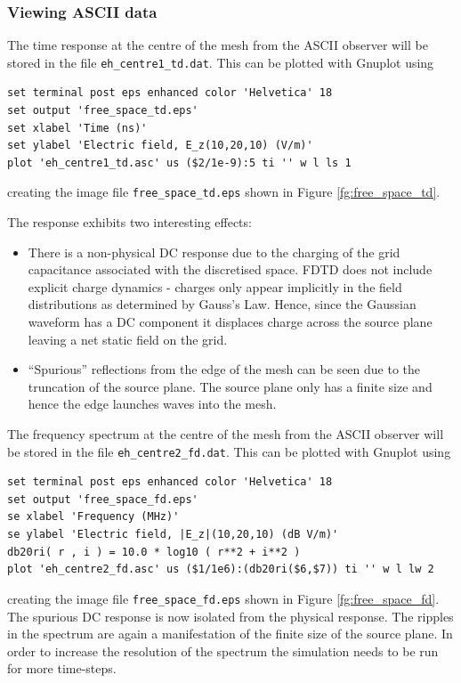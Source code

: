 \documentclass[onecolumn,a4paper]{article}
\numberwithin{equation}{section}
\begin{document}
\subsubsection{Viewing ASCII data}

The time response at the centre of the mesh from the ASCII observer will be
stored in the file \texttt{eh\_centre1\_td.dat}. This can be plotted with Gnuplot
using
\begin{verbatim}
set terminal post eps enhanced color 'Helvetica' 18
set output 'free_space_td.eps'
set xlabel 'Time (ns)'
set ylabel 'Electric field, E_z(10,20,10) (V/m)'
plot 'eh_centre1_td.asc' us ($2/1e-9):5 ti '' w l ls 1
\end{verbatim}
creating the image file \texttt{free\_space\_td.eps} shown in Figure \ref{fg:free_space_td}.

The response exhibits two interesting effects:
\begin{itemize}
 \item There is a non-physical DC response due to the charging of the grid capacitance associated
 with the discretised space. FDTD does not include explicit charge dynamics - charges only appear implicitly
 in the field distributions as determined by Gauss's Law. Hence,  since the Gaussian waveform has a DC component it displaces
 charge across the source plane leaving a net static field on the grid.  
 \item ``Spurious'' reflections from the edge of the mesh can be seen due to the truncation
 of the source plane. The source plane only has a finite size and hence the edge launches waves
 into the mesh.
\end{itemize}

The frequency spectrum at the centre of the mesh from the ASCII observer will be
stored in the file \texttt{eh\_centre2\_fd.dat}. This can be plotted with Gnuplot
using
\begin{verbatim}
set terminal post eps enhanced color 'Helvetica' 18
set output 'free_space_fd.eps'
se xlabel 'Frequency (MHz)'
se ylabel 'Electric field, |E_z|(10,20,10) (dB V/m)'
db20ri( r , i ) = 10.0 * log10 ( r**2 + i**2 )
plot 'eh_centre2_fd.asc' us ($1/1e6):(db20ri($6,$7)) ti '' w l lw 2
\end{verbatim}
creating the image file \texttt{free\_space\_fd.eps} shown in Figure \ref{fg:free_space_fd}.
The spurious DC response is
now isolated from the physical response. The ripples in the spectrum are
again a manifestation of the finite size of the source plane. In order to
increase the resolution of the spectrum the simulation needs to be run for
more time-steps.
\end{document}
